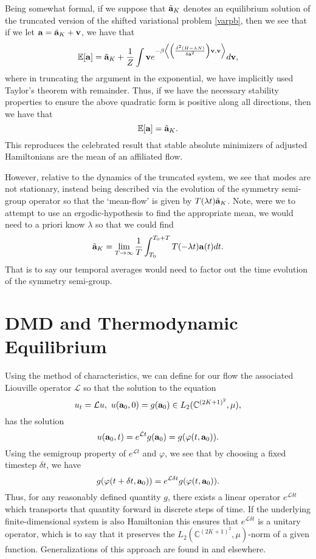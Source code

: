 \documentclass[aps,prl,preprint,groupedaddress]{revtex4-1}
\begin{document}
Being somewhat formal, if we suppose that $\tilde{{\bf a}}_{K}$ denotes an equilibrium solution of the truncated version of the shifted variational problem \eqref{varpb}, then we see that if we let ${\bf a} = \tilde{{\bf a}}_{K} + {\bf v}$, we have that
\[
\mathbb{E}[{\bf a}] = \tilde{{\bf a}}_{K} + \frac{1}{Z}\int {\bf v}e^{-\beta\left<\left(\frac{\delta^{2}(H-\lambda N)}{\delta {\bf a}^{2}}\right){\bf v},{\bf v} \right>}d{\bf v},
\]
where in truncating the argument in the exponential, we have implicitly used Taylor's theorem with remainder.  Thus, if we have the necessary stability properties to ensure the above quadratic form is positive along all directions, then we have that
\[
\mathbb{E}[{\bf a}] = \tilde{{\bf a}}_{K}.
\]
This reproduces the celebrated result that stable absolute minimizers of adjusted Hamiltonians are the mean of an affiliated flow.  

However, relative to the dynamics of the truncated system, we see that modes are not stationary, instead being described via the evolution of the symmetry semi-group operator so that the `mean-flow' is given by $T(\lambda t) \tilde{{\bf a}}_{K}$.  Note, were we to attempt to use an ergodic-hypothesis to find the appropriate mean, we would need to a priori know $\lambda$ so that we could find 
\[
\tilde{{\bf a}}_{K} = \lim_{T\rightarrow \infty}\frac{1}{T}\int_{T_{0}}^{T_{0}+T} T(-\lambda t){\bf a}(t) dt.
\]
That is to say our temporal averages would need to factor out the time evolution of the symmetry semi-group.  

\section*{DMD and Thermodynamic Equilibrium}
Using the method of characteristics, we can define for our flow the associated Liouville operator $\mathcal{L}$ so that the solution to the equation
\[
u_{t} = \mathcal{L}u, ~ u({\bf a}_{0},0) = g({\bf a}_{0}) \in L_{2}(\mathbb{C}^{(2K+1)^{2}},\mu),
\]
has the solution
\[
u({\bf a}_{0},t) = e^{\mathcal{L}t}g({\bf a}_{0}) = g(\varphi(t,{\bf a}_{0})).  
\]
Using the semigroup property of $e^{\mathcal{L}t}$ and $\varphi$, we see that by choosing a fixed timestep $\delta t$, we have 
\[
g(\varphi(t+\delta t,{\bf a}_{0}))= e^{\mathcal{L}\delta t} g(\varphi(t,{\bf a}_{0})).
\]
Thus, for any reasonably defined quantity $g$, there exists a linear operator $e^{\mathcal{L}\delta t}$ which transports that quantity forward in discrete steps of time. If the underlying finite-dimensional system is also Hamiltonian this ensures that $e^{\mathcal{L}\delta t}$ is a unitary operator, which is to say that it preserves the $L_{2}(\mathbb{C}^{(2K+1)^{2}},\mu)$-norm of a given function.  Generalizations of this approach are found in \cite{mezic1,williams,kutz} and elsewhere.  
\end{document}
